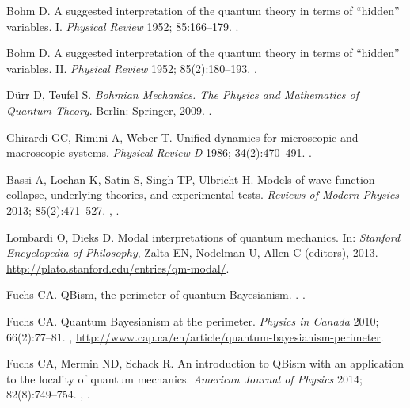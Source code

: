 \documentclass[DIV=calc,fontsize=12pt]{scrartcl} %
\theoremstyle{definition}
\theoremstyle{plain}
\begin{document}
\begin{thebibliography}{999}
Bohm D.
\newblock A suggested interpretation of the quantum theory in terms of ``hidden'' variables. I.
\newblock \emph{Physical Review} 1952; 85:166--179.
\newblock \href {http://dx.doi.org/10.1103/PhysRev.85.166}
{}.

Bohm D.
\newblock A suggested interpretation of the quantum theory in terms of ``hidden'' variables. II.
\newblock \emph{Physical Review} 1952; 85(2):180--193.
\newblock \href {http://dx.doi.org/10.1103/PhysRev.85.180}
{}.

D{\"u}rr D, Teufel S.
\newblock \emph{Bohmian Mechanics. The Physics and Mathematics of Quantum Theory}.
\newblock Berlin: Springer, 2009.
\newblock \href {http://dx.doi.org/10.1007/b99978}
{}.

Ghirardi GC, Rimini A, Weber T.
\newblock Unified dynamics for microscopic and macroscopic systems.
\newblock \emph{Physical Review D} 1986; 34(2):470--491.
\newblock \href {http://dx.doi.org/10.1103/PhysRevD.34.470}
{}.

Bassi A, Lochan K, Satin S, Singh TP, Ulbricht H.
\newblock Models of wave-function collapse, underlying theories, and experimental tests.
\newblock \emph{Reviews of Modern Physics} 2013; 85(2):471--527.
\newblock \href {http://arxiv.org/abs/1204.4325} {},
\href {http://dx.doi.org/10.1103/RevModPhys.85.471}
{}.

Lombardi O, Dieks D.
\newblock Modal interpretations of quantum mechanics.
\newblock In: \emph{Stanford Encyclopedia of Philosophy}, Zalta EN, Nodelman U, Allen C (editors), 2013.
\newblock \url{http://plato.stanford.edu/entries/qm-modal/}.

Fuchs CA.
\newblock QBism, the perimeter of quantum Bayesianism.
.
\newblock \href {http://arxiv.org/abs/1003.5209} {}.

Fuchs CA.
\newblock Quantum Bayesianism at the perimeter.
\newblock \emph{Physics in Canada} 2010; 66(2):77--81.
\newblock \href{http://arxiv.org/abs/1003.5182}{}, \url{http://www.cap.ca/en/article/quantum-bayesianism-perimeter}.

Fuchs CA, Mermin ND, Schack R.
\newblock An introduction to QBism with an application to the locality
of quantum mechanics.
\newblock \emph{American Journal of Physics} 2014; 82(8):749--754.
\newblock \href {http://arxiv.org/abs/1311.5253} {},
\href {http://dx.doi.org/10.1119/1.4874855}
{}.


\end{thebibliography}
\end{document}
